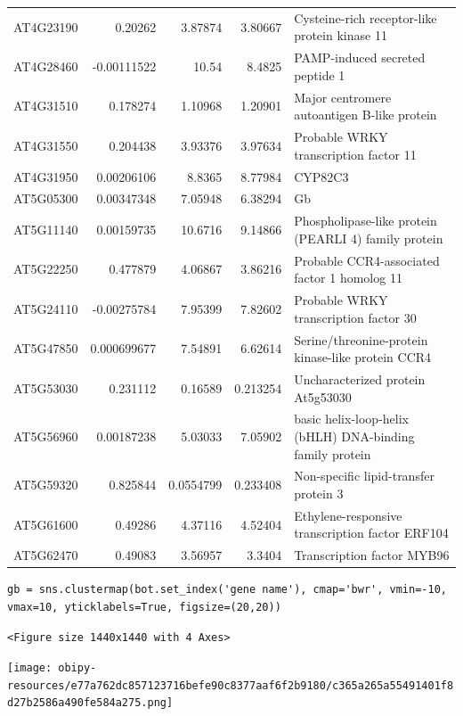 \documentclass[11pt]{article}
\begin{document}
\begin{center}
\begin{tabular}{lrrrl}
AT4G23190 & 0.20262 & 3.87874 & 3.80667 & Cysteine-rich receptor-like protein kinase 11\\
AT4G28460 & -0.00111522 & 10.54 & 8.4825 & PAMP-induced secreted peptide 1\\
AT4G31510 & 0.178274 & 1.10968 & 1.20901 & Major centromere autoantigen B-like protein\\
AT4G31550 & 0.204438 & 3.93376 & 3.97634 & Probable WRKY transcription factor 11\\
AT4G31950 & 0.00206106 & 8.8365 & 8.77984 & CYP82C3\\
AT5G05300 & 0.00347348 & 7.05948 & 6.38294 & Gb\\
AT5G11140 & 0.00159735 & 10.6716 & 9.14866 & Phospholipase-like protein (PEARLI 4) family protein\\
AT5G22250 & 0.477879 & 4.06867 & 3.86216 & Probable CCR4-associated factor 1 homolog 11\\
AT5G24110 & -0.00275784 & 7.95399 & 7.82602 & Probable WRKY transcription factor 30\\
AT5G47850 & 0.000699677 & 7.54891 & 6.62614 & Serine/threonine-protein kinase-like protein CCR4\\
AT5G53030 & 0.231112 & 0.16589 & 0.213254 & Uncharacterized protein At5g53030\\
AT5G56960 & 0.00187238 & 5.03033 & 7.05902 & basic helix-loop-helix (bHLH) DNA-binding family protein\\
AT5G59320 & 0.825844 & 0.0554799 & 0.233408 & Non-specific lipid-transfer protein 3\\
AT5G61600 & 0.49286 & 4.37116 & 4.52404 & Ethylene-responsive transcription factor ERF104\\
AT5G62470 & 0.49083 & 3.56957 & 3.3404 & Transcription factor MYB96\\
\end{tabular}
\end{center}


\begin{verbatim}
gb = sns.clustermap(bot.set_index('gene name'), cmap='bwr', vmin=-10, vmax=10, yticklabels=True, figsize=(20,20))
\end{verbatim}

\begin{verbatim}
<Figure size 1440x1440 with 4 Axes>
\end{verbatim}


\begin{center}
\texttt{[image: obipy-resources/e77a762dc857123716befe90c8377aaf6f2b9180/c365a265a55491401f8d27b2586a490fe584a275.png]}
\end{center}
\end{document}
